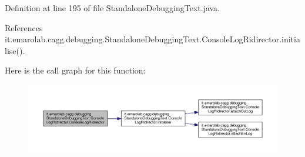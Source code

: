 Definition at line 195 of file Standalone\-Debugging\-Text.\-java.



References it.\-emarolab.\-cagg.\-debugging.\-Standalone\-Debugging\-Text.\-Console\-Log\-Ridirector.\-initialise().



Here is the call graph for this function\-:\nopagebreak
\begin{figure}[H]
\begin{center}
\leavevmode
\includegraphics[width=350pt]{classit_1_1emarolab_1_1cagg_1_1debugging_1_1StandaloneDebuggingText_1_1ConsoleLogRidirector_aacb3a28e0d1b20890ec8aa2fb21b61e8_cgraph}
\end{center}
\end{figure}


